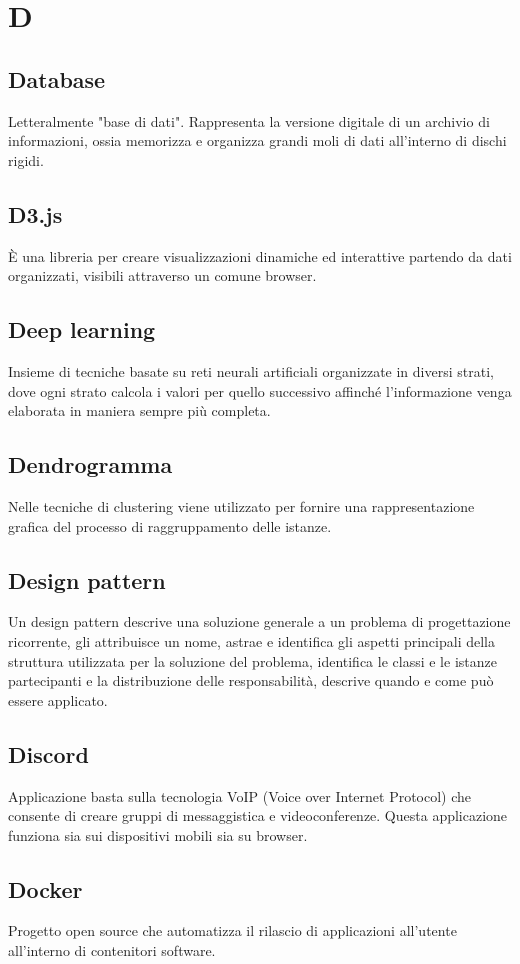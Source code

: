 \section*{D}
\markright{}

\subsection*{Database}
Letteralmente "base di dati". Rappresenta la versione digitale di un archivio di informazioni, ossia memorizza e organizza grandi moli di dati all'interno di dischi rigidi.

\subsection*{D3.js}
È una libreria  per creare visualizzazioni dinamiche ed interattive partendo da dati organizzati, visibili attraverso un comune browser.

\subsection*{Deep learning}
Insieme di tecniche basate su reti neurali artificiali organizzate in diversi strati, dove ogni strato calcola i valori per quello successivo affinché l'informazione venga elaborata in maniera sempre più completa.

\subsection*{Dendrogramma}
Nelle tecniche di clustering viene utilizzato per fornire una rappresentazione grafica del processo di raggruppamento delle istanze.

\subsection*{Design pattern}
Un design pattern descrive una soluzione generale a un problema di progettazione ricorrente, gli attribuisce un nome, astrae e identifica gli aspetti principali della struttura utilizzata per la soluzione del problema, identifica le classi e le istanze partecipanti e la distribuzione delle responsabilità, descrive quando e come può essere applicato. 

\subsection*{Discord}
Applicazione  basta sulla tecnologia VoIP (Voice over Internet Protocol) che consente di creare gruppi di messaggistica e videoconferenze. Questa applicazione funziona sia sui dispositivi mobili sia su browser.

\subsection*{Docker}
Progetto open source che automatizza il rilascio di applicazioni all'utente all'interno di contenitori software.


